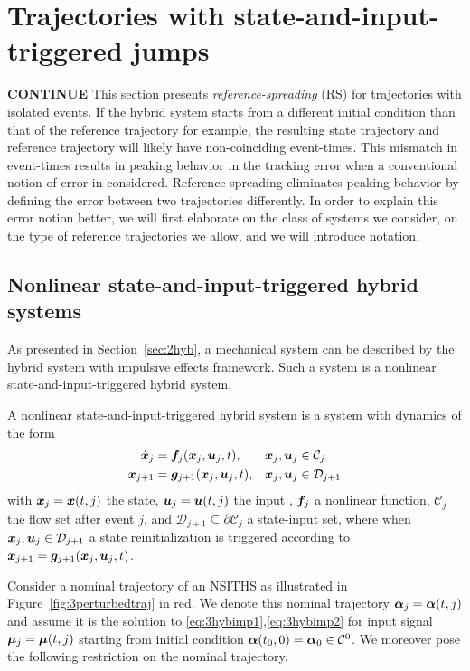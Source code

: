 \documentclass[../DC2017114Bouma.tex]{subfiles}
\begin{document}
\section{Trajectories with state-and-input-triggered jumps}
\textbf{CONTINUE}
This section presents \textit{reference-spreading} (RS) for trajectories with isolated events. If the hybrid system starts from a different initial condition than that of the reference trajectory for example, the resulting state trajectory and reference trajectory will likely have non-coinciding event-times. This mismatch in event-times results in peaking behavior in the tracking error when a conventional notion of error in considered. Reference-spreading eliminates peaking behavior by defining the error between two trajectories differently. In order to explain this error notion better, we will first elaborate on the class of systems we consider, on the type of reference trajectories we allow, and we will introduce notation.
%

\subsection{Nonlinear state-and-input-triggered hybrid systems}
As presented in Section~\ref{sec:2hyb}, a mechanical system can be described by the hybrid system with impulsive effects framework. Such a system is a nonlinear state-and-input-triggered hybrid system.

\begin{mydef}[NSITHS]\label{def:3nsiths}
A nonlinear state-and-input-triggered hybrid system is a system with dynamics of the form
\begin{align}
\dot{{\boldsymbol{x}}}_j &={\boldsymbol{f}}_j({\boldsymbol{x}}_j,{\boldsymbol{u}}_j,t), &{\boldsymbol{x}}_j,{\boldsymbol{u}}_j&\in \mathcal{C}_j\label{eq:3hybimp1}\\
{\boldsymbol{x}}_{j+1} &= {\boldsymbol{g}}_{j+1}({\boldsymbol{x}}_j,{\boldsymbol{u}}_j,t), &{\boldsymbol{x}}_j,{\boldsymbol{u}}_j&\in \mathcal{D}_{j+1} \label{eq:3hybimp2}
\end{align}
with ${\boldsymbol{x}}_j = {\boldsymbol{x}}(t,j)$ the state, ${\boldsymbol{u}}_j = {\boldsymbol{u}}(t,j)$ the input , ${\boldsymbol{f}}_j$ a nonlinear function, $\mathcal{C}_j$ the flow set after event $j$, and $\mathcal{D}_{j+1}\subseteq\partial \mathcal{C}_j$ a state-input set, where when ${\boldsymbol{x}}_j,{\boldsymbol{u}}_j\in \mathcal{D}_{j+1}$ a state reinitialization is triggered according to ${\boldsymbol{x}}_{j+1} = {\boldsymbol{g}}_{j+1}({\boldsymbol{x}}_j,{\boldsymbol{u}}_j,t)$.
\end{mydef} 

Consider a nominal trajectory of an NSITHS as illustrated in Figure~\ref{fig:3perturbedtraj} in red. We denote this nominal trajectory $\boldsymbol{\alpha}_j=\boldsymbol{\alpha}(t,j)$ and assume it is the solution to \eqref{eq:3hybimp1},\eqref{eq:3hybimp2} for input signal $\boldsymbol{\mu}_j=\boldsymbol{\mu}(t,j)$ starting from initial condition $\boldsymbol{\alpha}(t_0,0)=\boldsymbol{\alpha}_0\in \mathcal{C}^0$. We moreover pose the following restriction on the nominal trajectory.
\end{document}
